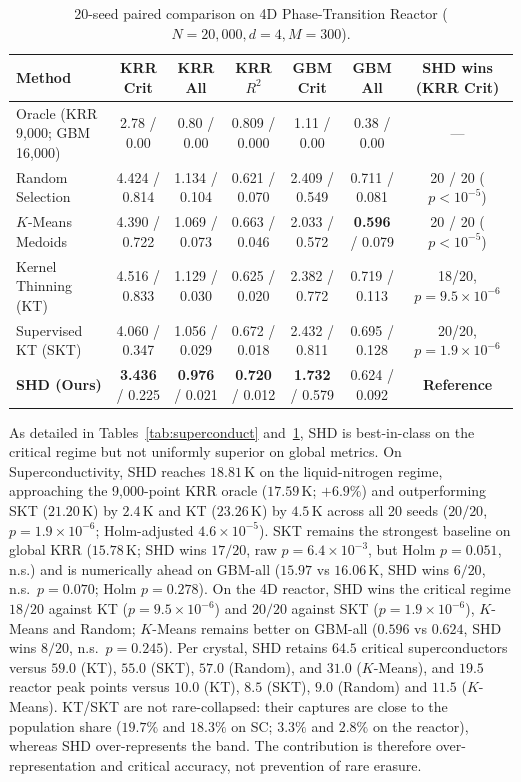 \documentclass[11pt,a4paper]{article}
\begin{document}
\begin{table}[t]
\centering
\small
\caption{20-seed paired comparison on 4D Phase-Transition Reactor ($N=20,000, d=4, M=300$).}
\label{tab:reactor}
\begin{tabular}{lcccccc}
\toprule
\textbf{Method} & \textbf{KRR Crit} & \textbf{KRR All} & \textbf{KRR $R^2$} & \textbf{GBM Crit} & \textbf{GBM All} & \textbf{SHD wins (KRR Crit)} \\
\midrule
Oracle (KRR 9,000; GBM 16,000) & 2.78 / 0.00 & 0.80 / 0.00 & 0.809 / 0.000 & 1.11 / 0.00 & 0.38 / 0.00 & --- \\
\midrule
Random Selection & 4.424 / 0.814 & 1.134 / 0.104 & 0.621 / 0.070 & 2.409 / 0.549 & 0.711 / 0.081 & 20 / 20 ($p < 10^{-5}$) \\
$K$-Means Medoids & 4.390 / 0.722 & 1.069 / 0.073 & 0.663 / 0.046 & 2.033 / 0.572 & \textbf{0.596} / 0.079 & 20 / 20 ($p < 10^{-5}$) \\
Kernel Thinning (KT) & 4.516 / 0.833 & 1.129 / 0.030 & 0.625 / 0.020 & 2.382 / 0.772 & 0.719 / 0.113 & 18/20, $p = 9.5 \times 10^{-6}$ \\
Supervised KT (SKT) & 4.060 / 0.347 & 1.056 / 0.029 & 0.672 / 0.018 & 2.432 / 0.811 & 0.695 / 0.128 & 20/20, $p = 1.9 \times 10^{-6}$ \\
\midrule
\textbf{SHD (Ours)} & \textbf{3.436} / 0.225 & \textbf{0.976} / 0.021 & \textbf{0.720} / 0.012 & \textbf{1.732} / 0.579 & 0.624 / 0.092 & \textbf{Reference} \\
\bottomrule
\end{tabular}
\end{table}

As detailed in Tables~\ref{tab:superconduct} and~\ref{tab:reactor}, SHD is best-in-class on the critical regime but not uniformly superior on global metrics. On Superconductivity, SHD reaches $18.81\,\mathrm{K}$ on the liquid-nitrogen regime, approaching the 9,000-point KRR oracle ($17.59\,\mathrm{K}$; $+6.9\%$) and outperforming SKT ($21.20\,\mathrm{K}$) by $2.4\,\mathrm{K}$ and KT ($23.26\,\mathrm{K}$) by $4.5\,\mathrm{K}$ across all 20 seeds ($20/20$, $p=1.9\times10^{-6}$; Holm-adjusted $4.6\times10^{-5}$). SKT remains the strongest baseline on global KRR ($15.78\,\mathrm{K}$; SHD wins $17/20$, raw $p=6.4\times10^{-3}$, but Holm $p=0.051$, n.s.) and is numerically ahead on GBM-all ($15.97$ vs $16.06\,\mathrm{K}$, SHD wins $6/20$, n.s.\ $p=0.070$; Holm $p=0.278$). On the 4D reactor, SHD wins the critical regime $18/20$ against KT ($p=9.5\times10^{-6}$) and $20/20$ against SKT ($p=1.9\times10^{-6}$), $K$-Means and Random; $K$-Means remains better on GBM-all ($0.596$ vs $0.624$, SHD wins $8/20$, n.s.\ $p=0.245$). Per crystal, SHD retains $64.5$ critical superconductors versus $59.0$ (KT), $55.0$ (SKT), $57.0$ (Random), and $31.0$ ($K$-Means), and $19.5$ reactor peak points versus $10.0$ (KT), $8.5$ (SKT), $9.0$ (Random) and $11.5$ ($K$-Means). KT/SKT are not rare-collapsed: their captures are close to the population share ($19.7\%$ and $18.3\%$ on SC; $3.3\%$ and $2.8\%$ on the reactor), whereas SHD over-represents the band. The contribution is therefore over-representation and critical accuracy, not prevention of rare erasure.
\end{document}
